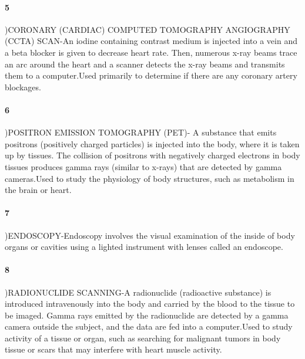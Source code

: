\documentclass[11pt]{article}
\begin{document}
\paragraph{5})CORONARY (CARDIAC) COMPUTED TOMOGRAPHY
ANGIOGRAPHY (CCTA) SCAN-An iodine containing
contrast medium is injected into a vein and a beta blocker is
given to decrease heart rate. Then, numerous x-ray beams trace an arc
around the heart and a scanner detects the x-ray beams and transmits
them to a computer.Used primarily to determine if there are any coronary artery blockages.
\paragraph{6})POSITRON EMISSION TOMOGRAPHY (PET)-
A substance that emits positrons (positively charged particles)
is injected into the body, where it is taken up by tissues. The collision of
positrons with negatively charged electrons in body tissues produces
gamma rays (similar to x-rays) that are detected by gamma cameras.Used to study the physiology of body structures, such as
metabolism in the brain or heart.
\paragraph{7})ENDOSCOPY-Endoscopy involves the visual examination of the inside of body
organs or cavities using a lighted instrument with lenses called an endoscope.
\paragraph{8})RADIONUCLIDE SCANNING-A radionuclide (radioactive substance) is
introduced intravenously into the body and carried by the
blood to the tissue to be imaged. Gamma rays emitted by the
radionuclide are detected by a gamma camera outside the
subject, and the data are fed into a computer.Used to study activity of a tissue or organ, such
as searching for malignant tumors in body tissue or scars that
may interfere with heart muscle activity.
\end{document}
